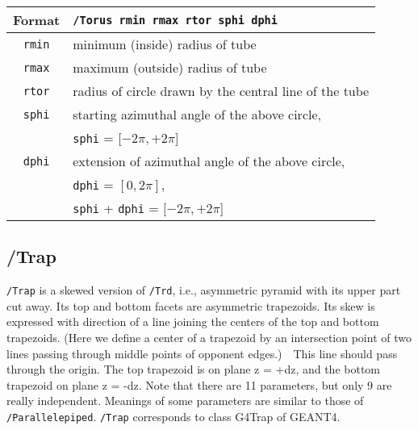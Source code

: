 \begin{tabular}{|c|l|}
\hline%
Format & \verb+/Torus rmin rmax rtor sphi dphi+\\
\hline%
\verb+rmin+  & minimum (inside)  radius of tube \\
\hline%
\verb+rmax+  & maximum (outside) radius of tube \\
\hline%
\verb+rtor+  & radius of circle drawn by the central line of the tube\\
\hline%
\verb+sphi+ & starting azimuthal angle of the above circle, \\
            & \verb+sphi+ = $[-2\pi, +2\pi$]\\
\hline%
\verb+dphi+ & extension of azimuthal angle of the above circle,\\
	    & \verb+dphi+ = $[0, 2\pi]$,\\
            &  \verb+sphi+ + \verb+dphi+ = $[-2\pi, +2\pi$] \\
\hline%
\end{tabular}


\subsection{/Trap}
\verb+/Trap+ is a skewed version of \verb+/Trd+, i.e.,   
asymmetric pyramid with its upper part cut away.
Its top and bottom facets are asymmetric trapezoids.   
Its skew is expressed with direction of   
a line joining the centers of the top and bottom trapezoids.  
(Here we define a center of a trapezoid  by an intersection   
point of two lines passing through middle points of opponent edges.)\ \   
This line should pass through the origin.
The     top    trapezoid is on plane z = +dz,   
and the bottom trapezoid    on plane z = -dz.
Note that there are 11 parameters, but only 9 are really independent.
Meanings of some parameters are similar to those of \verb+/Parallelepiped+.
\verb+/Trap+ corresponds to class G4Trap of GEANT4.
\vspace{.20in}

